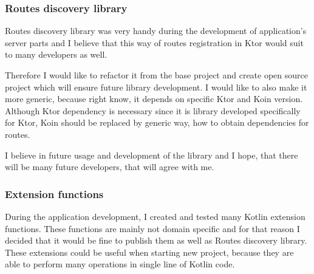 \subsubsection{Routes discovery library}
Routes discovery library was very handy during the development of application's server parts 
and I believe that this way of routes registration in Ktor would suit to many developers as well.

Therefore I would like to refactor it from the base project 
and create open source project which will ensure future library development.
I would like to also make it more generic,
because right know, 
it depends on specific Ktor and Koin version.
Although Ktor dependency is necessary
since it is library developed specifically for Ktor,
Koin should be replaced by generic way, 
how to obtain dependencies for routes.

I believe in future usage and development of the library
and I hope, 
that there will be many future developers,
that will agree with me.


\subsubsection{Extension functions}
During the application development,
I created and tested many Kotlin extension functions.
These functions are mainly not domain specific
and for that reason I decided that it would be fine to publish them as well as Routes discovery library.
These extensions could be useful when starting new project,
because they are able to perform many operations in single line of Kotlin code.